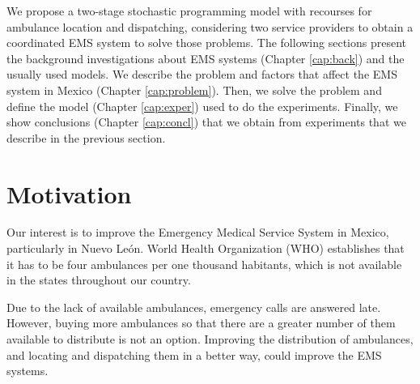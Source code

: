 We propose a two-stage stochastic programming model with recourses for ambulance location and dispatching, considering two service providers to obtain a coordinated EMS system to solve those problems. The following sections present the background investigations about EMS sys\-tems (Chapter \ref{cap:back}) and the usually used models. We describe the problem and factors that affect the EMS system in Mexico (Chapter \ref{cap:problem}). Then, we solve the problem and define the model (Chapter \ref{cap:exper}) used to do the experiments. Finally, we show conclusions (Chapter \ref{cap:concl}) that we obtain from experiments that we describe in the previous section.

\section{Motivation}
Our interest is to improve the Emergency Medical Service System in Mexico, particularly in Nuevo León. World Health Organization (WHO) establishes that it has to be four ambulances per one thousand habitants, which is not available in the states throughout our country.

Due to the lack of available ambulances, emergency calls are answered late. However, buying more ambulances so that there are a greater number of them available to distribute is not an option. Improving the distribution of ambulances, and locating and dispatching them in a better way, could improve the EMS systems.



